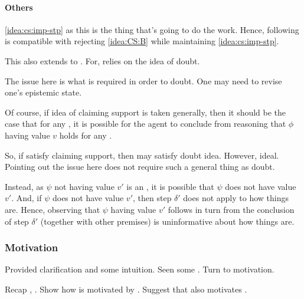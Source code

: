\paragraph{Others}

\begin{note}
  \autoref{idea:cs:imp-stp} as this is the thing that's going to do the work.
  Hence, following is compatible with rejecting \autoref{idea:CS:B} while maintaining \autoref{idea:cs:imp-stp}.

  This also extends to \citeauthor{Wright:2011wn}.
  For, \citeauthor{Wright:2011wn} relies on the idea of doubt.

  The issue here is what is required in order to doubt.
  One may need to revise one's epistemic state.

  Of course, if idea of claiming support is taken generally, then it should be the case that for any \epP{} \world{}, it is possible for the agent to conclude from reasoning that \(\phi\) having value \(v\) holds for any \epVAd{} \world{}.

  So, if satisfy claiming support, then may satisfy doubt idea.
  However, ideal.
  Pointing out the issue here does not require such a general thing as doubt.
\end{note}

\begin{note}
  Instead, as \(\psi\) not having value \(v'\) is an \ep{}, it is possible that \(\psi\) does not have value \(v'\).
  And, if \(\psi\) does not have value \(v'\), then step \(\delta'\) does not apply to how things are.
  Hence, observing that \(\psi\) having value \(v'\) follows in turn from the conclusion of step \(\delta'\) (together with other premises) is uninformative about how things are.
\end{note}

\subsubsection{Motivation}
\label{sec:motivation}

\begin{note}
  Provided clarification and some intuition.
  Seen some .
  Turn to motivation.

  Recap \ideaS{}, \support{}.
  Show how \ideaCS{} is motivated by \ideaS{}.
  Suggest that \ideaCS{} also motivates \ideaS{}.
\end{note}


